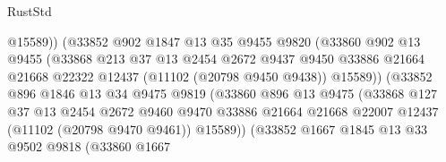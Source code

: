 \begin{lexlean}{RustStd}
\begin{coremodule}
                                  @15589))
                              (@33852
                                @902
                                @1847
                                @13
                                @35
                                @9455
                                @9820
                                (@33860
                                  @902
                                  @13
                                  @9455
                                  (@33868
                                    @213
                                    @37
                                    @13
                                    @2454
                                    @2672
                                    @9437
                                    @9450
                                    @33886
                                    @21664
                                    @21668
                                    @22322
                                    @12437
                                    (@11102 (@20798 @9450 @9438))
                                    @15589))
                                (@33852
                                  @896
                                  @1846
                                  @13
                                  @34
                                  @9475
                                  @9819
                                  (@33860
                                    @896
                                    @13
                                    @9475
                                    (@33868
                                      @127
                                      @37
                                      @13
                                      @2454
                                      @2672
                                      @9460
                                      @9470
                                      @33886
                                      @21664
                                      @21668
                                      @22007
                                      @12437
                                      (@11102 (@20798 @9470 @9461))
                                      @15589))
                                  (@33852
                                    @1667
                                    @1845
                                    @13
                                    @33
                                    @9502
                                    @9818
                                    (@33860
                                      @1667

\end{coremodule}
\end{lexlean}
